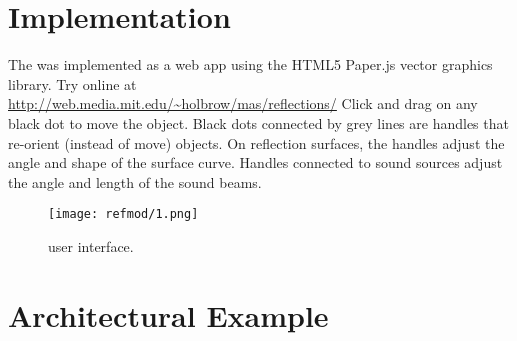 \section{Implementation}
\label{sec:refmod-implementation}
The  was implemented as a web app using the HTML5
Paper.js vector graphics
library.
Try  online at\\
\noindent \url{http://web.media.mit.edu/~holbrow/mas/reflections/}
Click and drag on any black dot to move the object. Black dots
connected by grey lines are handles that re-orient (instead of move)
objects. On reflection surfaces, the handles adjust the angle and
shape of the surface curve. Handles connected to sound sources adjust
the angle and length of the sound beams.
\begin{figure}[h]
  \texttt{[image: refmod/1.png]}
  \caption[]{ user interface.}
  \label{fig:refmod-simple}
\end{figure}

\section{ Architectural Example}
\label{sec:refmod-user-interf}

